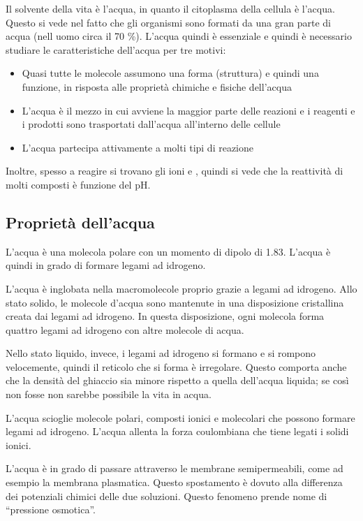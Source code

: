 
Il solvente della vita è l'acqua, in quanto il citoplasma della cellula
è l'acqua. Questo si vede nel fatto che gli organismi sono formati da
una gran parte di acqua (nell uomo circa il 70 \%). L'acqua quindi è
essenziale e quindi è necessario studiare le caratteristiche dell'acqua
per tre motivi: 
\begin{itemize}
    \item Quasi tutte le molecole assumono una forma (struttura)
    e quindi una funzione, in risposta alle proprietà chimiche e fisiche
    dell'acqua 
    \item L'acqua è il mezzo in cui avviene la maggior parte delle
    reazioni e i reagenti e i prodotti sono trasportati dall'acqua
    all'interno delle cellule
    \item L'acqua partecipa attivamente a molti tipi
    di reazione
\end{itemize}

Inoltre, spesso a reagire si trovano gli ioni  e
, quindi si vede che la reattività di molti composti è funzione
del pH.

\subsection{Proprietà dell'acqua}

L'acqua è una molecola polare con un momento di dipolo di 1.83. L'acqua
è quindi in grado di formare legami ad idrogeno.

L'acqua è inglobata nella macromolecole proprio grazie a legami ad
idrogeno. Allo stato solido, le molecole d'acqua sono mantenute in una
disposizione cristallina creata dai legami ad idrogeno. In questa
disposizione, ogni molecola forma quattro legami ad idrogeno con altre
molecole di acqua.


Nello stato liquido, invece, i legami ad idrogeno si formano e si
rompono velocemente, quindi il reticolo che si forma è irregolare.
Questo comporta anche che la densità del ghiaccio sia minore rispetto a
quella dell'acqua liquida; se così non fosse non sarebbe possibile la
vita in acqua.

L'acqua scioglie molecole polari, composti ionici e molecolari che
possono formare legami ad idrogeno. L'acqua allenta la forza coulombiana
che tiene legati i solidi ionici.

L'acqua è in grado di passare attraverso le membrane semipermeabili,
come ad esempio la membrana plasmatica. Questo spostamento è dovuto alla
differenza dei potenziali chimici delle due soluzioni. Questo fenomeno
prende nome di ``pressione osmotica''.

